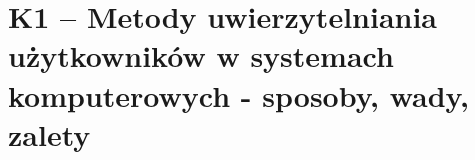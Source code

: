 \section{K1 -- Metody uwierzytelniania użytkowników w systemach komputerowych - sposoby, wady, zalety}